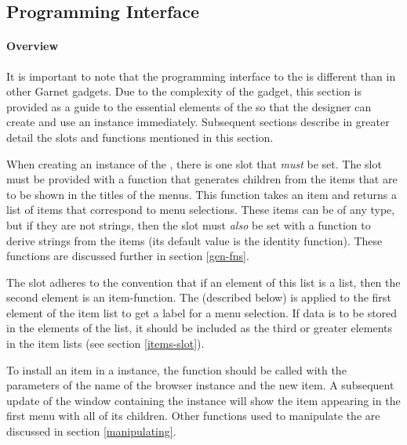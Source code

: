 \subsection{Programming Interface}

\paragraph{Overview}
It is important to note that the programming
interface to the  is different than in other Garnet
gadgets.  Due to the complexity of the gadget, this section is
provided as a guide to the essential elements of the
 so that the designer can create and use an
instance immediately.  Subsequent sections describe in greater detail
the slots and functions mentioned in this section.

When creating an instance of the , there is one
slot that {\it must} be set.  The slot
 must be provided with a function
that generates children from the items that are to be shown in the
titles of the menus.  This function takes an item and returns a list
of items that correspond to menu selections.  These items can be of
any type, but if they are not strings, then the slot
 must {\it also} be set with a function to
derive strings from the items (its default value is the identity
function).  These functions are discussed further in section
\ref{gen-fns}.

The  slot adheres to the convention that if an element of this
list is a list, then the second element is an item-function.
The  (described below) is applied to the first
element of the item list to get a label for a menu selection.  If data is to
be stored in the elements of the  list, it should be included as
the third or greater elements in the item lists (see section \ref{items-slot}).

To install an item in a  instance, the function
{\bf {}} should be called with the parameters of the
name of the browser instance and the new item.  A subsequent update of
the window containing the instance will show the item appearing in the
first menu with all of its children.  Other functions used to
manipulate the  are discussed in section
\ref{manipulating}.

